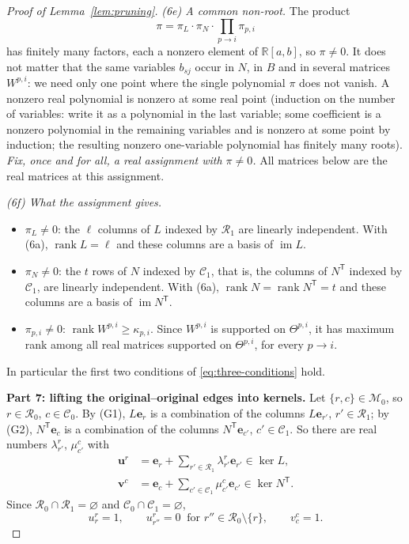 \documentclass[11pt]{article}
\theoremstyle{remark}
\DeclareMathOperator{\rank}{rank}
\DeclareMathOperator{\im}{im}
\newcommand{\R}{\mathbb R}
\newcommand{\Step}[1]{\par\medskip\noindent\textbf{#1}\enspace}
\newcommand{\tp}{^{\mathsf T}}
\newcommand{\cR}{\mathcal R}
\newcommand{\cC}{\mathcal C}
\newcommand{\cM}{\mathcal M}
\newcommand{\bu}{\mathbf u}
\newcommand{\bv}{\mathbf v}
\newcommand{\be}{\mathbf e}
\begin{document}
\begin{proof}[Proof of Lemma~\ref{lem:pruning}]
\smallskip\noindent\emph{(6e) A common non-root.}
The product
\[
 \pi=\pi_L\cdot\pi_N\cdot\prod_{p\to i}\pi_{p,i}
\]
has finitely many factors, each a nonzero element of $\R[a,b]$, so
$\pi\ne0$. It does not matter that the same variables $b_{sj}$ occur in $N$,
in $B$ and in several matrices $W^{p,i}$: we need only one point where the
single polynomial $\pi$ does not vanish. A nonzero real polynomial is
nonzero at some real point (induction on the number of variables: write it
as a polynomial in the last variable; some coefficient is a nonzero
polynomial in the remaining variables and is nonzero at some point by
induction; the resulting nonzero one-variable polynomial has finitely many
roots). \emph{Fix, once and for all, a real assignment with $\pi\ne0$.}
All matrices below are the real matrices at this assignment.

\smallskip\noindent\emph{(6f) What the assignment gives.}
\begin{itemize}[leftmargin=2.5em]
\item[(G1)] $\pi_L\ne0$: the $\ell$ columns of $L$ indexed by $\cR_1$ are
linearly independent. With (6a), $\rank L=\ell$ and these columns are a
basis of $\im L$.
\item[(G2)] $\pi_N\ne0$: the $t$ rows of $N$ indexed by $\cC_1$, that is,
the columns of $N\tp$ indexed by $\cC_1$, are linearly independent. With
(6a), $\rank N=\rank N\tp=t$ and these columns are a basis of $\im N\tp$.
\item[(G3)] $\pi_{p,i}\ne0$: $\rank W^{p,i}\ge\kappa_{p,i}$. Since $W^{p,i}$
is supported on $\Theta^{p,i}$, it has maximum rank among all real matrices
supported on $\Theta^{p,i}$, for every $p\to i$.
\end{itemize}
In particular the first two conditions of \eqref{eq:three-conditions} hold.

\Step{Part 7: lifting the original--original edges into kernels.}
Let $\{r,c\}\in\cM_0$, so $r\in\cR_0$, $c\in\cC_0$. By (G1),
$L\be_r$ is a combination of the columns $L\be_{r'}$, $r'\in\cR_1$; by (G2),
$N\tp\be_c$ is a combination of the columns $N\tp\be_{c'}$, $c'\in\cC_1$.
So there are real numbers $\lambda^r_{r'}$, $\mu^c_{c'}$ with
\begin{equation}\label{eq:pruning-lifts}
 \begin{aligned}
 \bu^r&=\be_r+\sum_{r'\in \cR_1}\lambda_{r'}^r \be_{r'}
                 \in\ker L,\\
 \bv^c&=\be_c+\sum_{c'\in \cC_1}\mu_{c'}^c \be_{c'}
                 \in\ker N\tp.
 \end{aligned}
\end{equation}
Since $\cR_0\cap\cR_1=\varnothing$ and $\cC_0\cap\cC_1=\varnothing$,
\begin{equation}\label{eq:lift-coordinates}
 u^r_{r}=1,\qquad u^r_{r''}=0\ \text{ for }r''\in\cR_0\setminus\{r\},
 \qquad v^c_c=1 .
\end{equation}


\end{proof}
\end{document}
